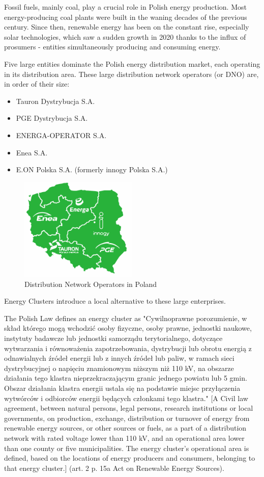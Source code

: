 \par Fossil fuels, mainly coal, play a crucial role in Polish energy production. Most energy-producing coal plants were built in the waning decades of the previous century. Since then, renewable energy has been on the constant rise, especially solar technologies, which saw a sudden growth in 2020 thanks to the influx of prosumers - entities simultaneously producing and consuming energy.
\par Five large entities dominate the Polish energy distribution market, each operating in its distribution area. These large distribution network operators (or DNO) are, in order of their size:
\begin{itemize}
  \item Tauron Dystrybucja S.A.
  \item PGE Dystrybucja S.A.
  \item ENERGA-OPERATOR S.A.
  \item Enea S.A.
  \item E.ON Polska S.A. (formerly innogy Polska S.A.)
\end{itemize}
\begin{figure}[htbp]
 \centering
 \includegraphics[width=0.5\textwidth]{gfx/EnergyDistributionMap}
 \caption{Distribution Network Operators in Poland}
 \label{fig:chapter02:energydistribution}
\end{figure}
\par Energy Clusters introduce a local alternative to these large enterprises. 
\par The Polish Law defines an energy cluster as "Cywilnoprawne porozumienie, w skład którego mogą wchodzić osoby fizyczne, osoby prawne, jednostki naukowe, instytuty badawcze lub jednostki samorządu terytorialnego, dotyczące wytwarzania i równoważenia zapotrzebowania, dystrybucji lub obrotu energią z odnawialnych źródeł energii lub z innych źródeł lub paliw, w ramach sieci dystrybucyjnej o napięciu znamionowym niższym niż 110 kV, na obszarze działania tego klastra nieprzekraczającym granic jednego powiatu lub 5 gmin. Obszar działania klastra energii ustala się na podstawie miejsc przyłączenia wytwórców i odbiorców energii będących członkami tego klastra." [A Civil law agreement, between natural persons, legal persons, research institutions or local governments, on production, exchange, distribution or turnover of energy from renewable energy sources, or other sources or fuels, as a part of a distribution network with rated voltage lower than 110 kV, and an operational area lower than one county or five municipalities. The energy cluster's operational area is defined, based on the locations of energy producers and consumers, belonging to that energy cluster.]  (art. 2 p. 15a Act on Renewable Energy Sources).

